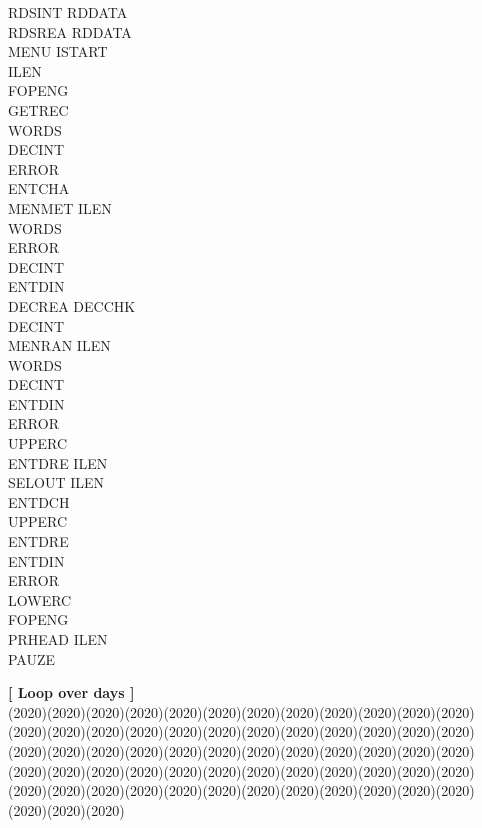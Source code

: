 \documentclass[11pt]{article}
\begin{document}
\begin{tabbing}
\>\> \> \> RDSINT\> \> RDDATA\\
\>\> \> \> RDSREA\> \> RDDATA\\
\>\> \> \> MENU\> \> ISTART\\
\>\> \> \> \> \> ILEN\\
\>\> \> \> \> \> FOPENG\\
\>\> \> \> \> \> GETREC\\
\>\> \> \> \> \> WORDS\\
\>\> \> \> \> \> DECINT\\
\>\> \> \> \> \> ERROR\\
\>\> \> \> \> \> ENTCHA\\
\>\> \> \> MENMET\> \> ILEN\\
\>\> \> \> \> \> WORDS\\
\>\> \> \> \> \> ERROR\\
\>\> \> \> \> \> DECINT\\
\>\> \> \> \> \> ENTDIN\\
\>\> \> \> \> \> DECREA\> \> DECCHK\\
\>\> \> \> DECINT\\
\>\> \> \> MENRAN\> \> ILEN\\
\>\> \> \> \> \> WORDS\\
\>\> \> \> \> \> DECINT\\
\>\> \> \> \> \> ENTDIN\\
\>\> \> \> \> \> ERROR\\
\>\> \> \> UPPERC\\
\>\> \> \> ENTDRE\> \> ILEN\\
\>\> \> \> SELOUT\> \> ILEN\\
\>\> \> \> \> \> ENTDCH\\
\>\> \> \> \> \> UPPERC\\
\>\> \> \> \> \> ENTDRE\\
\>\> \> \> \> \> ENTDIN\\
\>\> \> \> \> \> ERROR\\
\>\> \> \> \> \> LOWERC\\
\>\> \> \> \> \> FOPENG\\
\>\> \> \> PRHEAD\> \> ILEN\\
\>\> \> \> PAUZE
\end{tabbing}
\strut\hfill {\bf [ Loop over days ]}\\
 \GrBox(2020)\GrBox(2020)\GrBox(2020)\GrBox(2020)\GrBox(2020)\GrBox(2020)\GrBox(2020)\GrBox(2020)\GrBox(2020)\GrBox(2020)\GrBox(2020)\GrBox(2020)\GrBox(2020)\GrBox(2020)\GrBox(2020)\GrBox(2020)\GrBox(2020)\GrBox(2020)\GrBox(2020)\GrBox(2020)\GrBox(2020)\GrBox(2020)\GrBox(2020)\GrBox(2020)\GrBox(2020)\GrBox(2020)\GrBox(2020)\GrBox(2020)\GrBox(2020)\GrBox(2020)\GrBox(2020)\GrBox(2020)\GrBox(2020)\GrBox(2020)\GrBox(2020)\GrBox(2020)\GrBox(2020)\GrBox(2020)\GrBox(2020)\GrBox(2020)\GrBox(2020)\GrBox(2020)\GrBox(2020)\GrBox(2020)\GrBox(2020)\GrBox(2020)\GrBox(2020)\GrBox(2020)\GrBox(2020)\GrBox(2020)\GrBox(2020)\GrBox(2020)\GrBox(2020)\GrBox(2020)\GrBox(2020)\GrBox(2020)\GrBox(2020)\GrBox(2020)\GrBox(2020)\GrBox(2020)\GrBox(2020)\GrBox(2020)\GrBox(2020)\nwln
\end{document}
